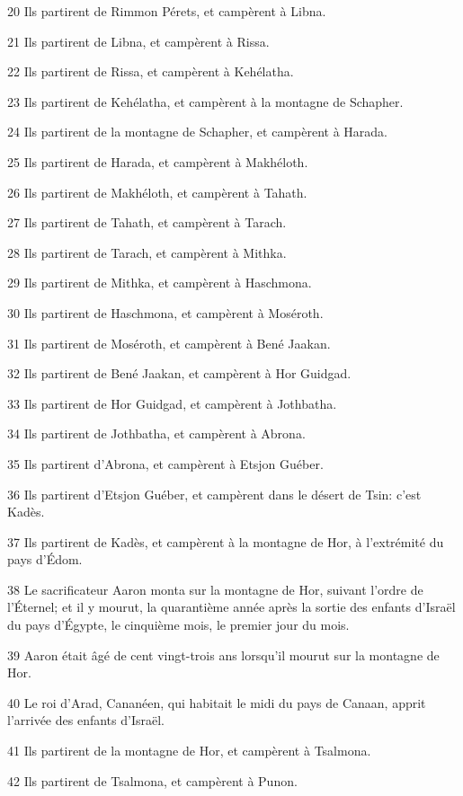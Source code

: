 \par 20 Ils partirent de Rimmon Pérets, et campèrent à Libna.
\par 21 Ils partirent de Libna, et campèrent à Rissa.
\par 22 Ils partirent de Rissa, et campèrent à Kehélatha.
\par 23 Ils partirent de Kehélatha, et campèrent à la montagne de Schapher.
\par 24 Ils partirent de la montagne de Schapher, et campèrent à Harada.
\par 25 Ils partirent de Harada, et campèrent à Makhéloth.
\par 26 Ils partirent de Makhéloth, et campèrent à Tahath.
\par 27 Ils partirent de Tahath, et campèrent à Tarach.
\par 28 Ils partirent de Tarach, et campèrent à Mithka.
\par 29 Ils partirent de Mithka, et campèrent à Haschmona.
\par 30 Ils partirent de Haschmona, et campèrent à Moséroth.
\par 31 Ils partirent de Moséroth, et campèrent à Bené Jaakan.
\par 32 Ils partirent de Bené Jaakan, et campèrent à Hor Guidgad.
\par 33 Ils partirent de Hor Guidgad, et campèrent à Jothbatha.
\par 34 Ils partirent de Jothbatha, et campèrent à Abrona.
\par 35 Ils partirent d'Abrona, et campèrent à Etsjon Guéber.
\par 36 Ils partirent d'Etsjon Guéber, et campèrent dans le désert de Tsin: c'est Kadès.
\par 37 Ils partirent de Kadès, et campèrent à la montagne de Hor, à l'extrémité du pays d'Édom.
\par 38 Le sacrificateur Aaron monta sur la montagne de Hor, suivant l'ordre de l'Éternel; et il y mourut, la quarantième année après la sortie des enfants d'Israël du pays d'Égypte, le cinquième mois, le premier jour du mois.
\par 39 Aaron était âgé de cent vingt-trois ans lorsqu'il mourut sur la montagne de Hor.
\par 40 Le roi d'Arad, Cananéen, qui habitait le midi du pays de Canaan, apprit l'arrivée des enfants d'Israël.
\par 41 Ils partirent de la montagne de Hor, et campèrent à Tsalmona.
\par 42 Ils partirent de Tsalmona, et campèrent à Punon.
